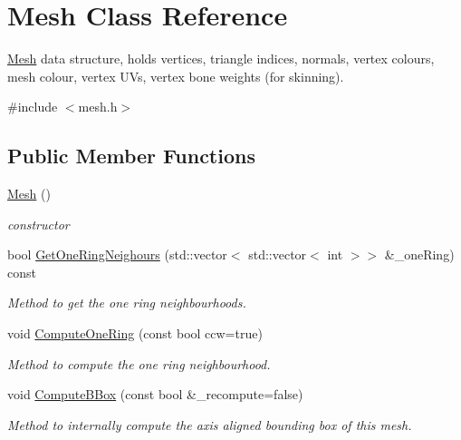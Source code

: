 \hypertarget{classMesh}{}\section{Mesh Class Reference}
\label{classMesh}


\hyperlink{classMesh}{Mesh} data structure, holds vertices, triangle indices, normals, vertex colours, mesh colour, vertex U\+Vs, vertex bone weights (for skinning).  




{\ttfamily \#include $<$mesh.\+h$>$}

\subsection*{Public Member Functions}
\begin{DoxyCompactItemize}
\item 
\hyperlink{classMesh_a2af137f1571af89172b9c102302c416b}{Mesh} ()\hypertarget{classMesh_a2af137f1571af89172b9c102302c416b}{}\label{classMesh_a2af137f1571af89172b9c102302c416b}

\begin{DoxyCompactList}\small\item\em constructor \end{DoxyCompactList}\item 
bool \hyperlink{classMesh_a933629b3306bc2fe4a7b6e9eaaecdd06}{Get\+One\+Ring\+Neighours} (std\+::vector$<$ std\+::vector$<$ int $>$$>$ \&\+\_\+one\+Ring) const 
\begin{DoxyCompactList}\small\item\em Method to get the one ring neighbourhoods. \end{DoxyCompactList}\item 
void \hyperlink{classMesh_aa16697eb508e705bd7fcdbf77156bc67}{Compute\+One\+Ring} (const bool ccw=true)\hypertarget{classMesh_aa16697eb508e705bd7fcdbf77156bc67}{}\label{classMesh_aa16697eb508e705bd7fcdbf77156bc67}

\begin{DoxyCompactList}\small\item\em Method to compute the one ring neighbourhood. \end{DoxyCompactList}\item 
void \hyperlink{classMesh_a9f8c0578b4a766b0e3cbe3df5fe42311}{Compute\+B\+Box} (const bool \&\+\_\+recompute=false)
\begin{DoxyCompactList}\small\item\em Method to internally compute the axis aligned bounding box of this mesh. \end{DoxyCompactList}\end{DoxyCompactItemize}
